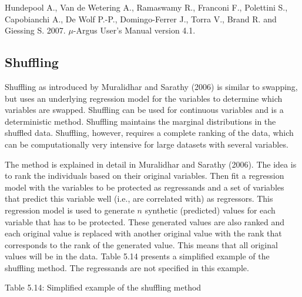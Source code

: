 \documentclass[letterpaper,10pt,english]{sphinxmanual}
\begin{document}
Hundepool A., Van de Wetering A., Ramaswamy R., Franconi F., Polettini
S., Capobianchi A., De Wolf P.-P., Domingo-Ferrer J., Torra V., Brand R.
and Giessing S. 2007. \(\mu\)-Argus User’s Manual version 4.1.


\subsection{Shuffling}
\label{\detokenize{anon_methods:shuffling}}
Shuffling as introduced by Muralidhar and Sarathy (2006) is similar to
swapping, but uses an underlying regression model for the variables to
determine which variables are swapped. Shuffling can be used for
continuous variables and is a deterministic method. Shuffling maintains
the marginal distributions in the shuffled data. Shuffling, however,
requires a complete ranking of the data, which can be computationally
very intensive for large datasets with several variables.

The method is explained in detail in Muralidhar and Sarathy (2006). The
idea is to rank the individuals based on their original variables. Then
fit a regression model with the variables to be protected as regressands
and a set of variables that predict this variable well (i.e., are
correlated with) as regressors. This regression model is used to
generate \(n\) synthetic (predicted) values for each variable that
has to be protected. These generated values are also ranked and each
original value is replaced with another original value with the rank
that corresponds to the rank of the generated value. This means that all
original values will be in the data. Table 5.14 presents a simplified
example of the shuffling method. The regressands are not specified in
this example.

Table 5.14: Simplified example of the shuffling method
\end{document}
